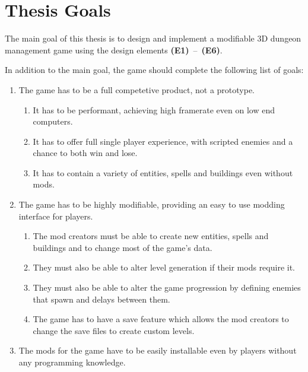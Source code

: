 \section{Thesis Goals}

The main goal of this thesis is to design and implement a modifiable 3D dungeon management game using the design elements \textbf{(E1)}~--~\textbf{(E6)}.

In addition to the main goal, the game should complete the following list of goals:

\begin{enumerate}[label=\textbf{(G\arabic*)}]
    \item The game has to be a full competetive product, not a prototype.
        \begin{enumerate}[label=\textbf{(G1.\arabic*)}]
            \item It has to be performant, achieving high framerate even on low end computers.
            \item It has to offer full single player experience, with scripted enemies and a chance to both win and lose.
            \item It has to contain a variety of entities, spells and buildings even without mods.
        \end{enumerate}
    \item The game has to be highly modifiable, providing an easy to use modding interface for players.
        \begin{enumerate}[label=\textbf{(G2.\arabic*)}]
            \item The mod creators must be able to create new entities, spells and buildings and to change most of the game's data.
            \item They must also be able to alter level generation if their mods require it.
            \item They must also be able to alter the game progression by defining enemies that spawn and delays between them.
            \item The game has to have a save feature which allows the mod creators to change the save files to create custom levels.
        \end{enumerate}
    \item The mods for the game have to be easily installable even by players without any programming knowledge. 
\end{enumerate}
